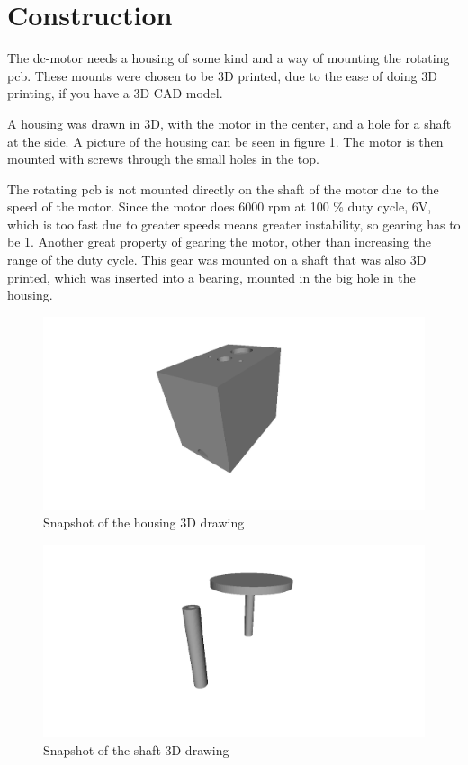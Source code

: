 \section{Construction}
The dc-motor needs a housing of some kind and a way of mounting the rotating pcb.
These mounts were chosen to be 3D printed, due to the ease of doing 3D printing, if you have a 3D CAD model.

A housing was drawn in 3D, with the motor in the center, and a hole for a shaft at the side. 
A picture of the housing can be seen in figure \ref{fig:housing3D}.
The motor is then mounted with screws through the small holes in the top.

The rotating pcb is not mounted directly on the shaft of the motor due to the speed of the motor.
Since the motor does 6000 rpm at 100 \% duty cycle, 6V, which is too fast due to greater speeds means greater instability, so gearing has to be 1.
Another great property of gearing the motor, other than increasing the range of the duty cycle.
This gear was mounted on a shaft that was also 3D printed, which was inserted into a bearing, mounted in the big hole in the housing.

\begin{figure}
 \centering
 \includegraphics[width=\textwidth]{img/housing3D}
 \caption{Snapshot of the housing 3D drawing}
 \label{fig:housing3D}
\end{figure}

\begin{figure}
 \centering
 \includegraphics[width=\textwidth]{img/shaft_3d}
 \caption{Snapshot of the shaft 3D drawing}
 \label{fig:shaft3D}
\end{figure}

